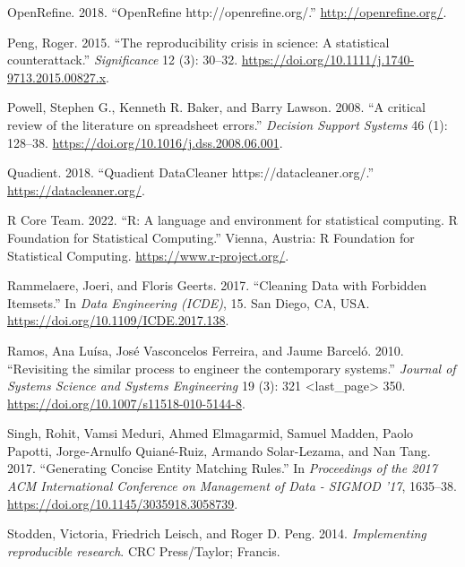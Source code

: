 \documentclass[
]{article}
\newlength{\cslhangindent}
\newlength{\cslentryspacingunit} %
\newenvironment{CSLReferences}[2] %
 {%
  \setlength{\parindent}{0pt}
  \ifodd #1
  \let\oldpar\par
  \def\par{\hangindent=\cslhangindent\oldpar}
  \fi
  \setlength{\parskip}{#2\cslentryspacingunit}
 }%
 {}
\begin{document}
\begin{CSLReferences}{1}{0}
\leavevmode{}%
OpenRefine. 2018. {``{OpenRefine http://openrefine.org/}.''}
\url{http://openrefine.org/}.

\leavevmode{}%
Peng, Roger. 2015. {``{The reproducibility crisis in science: A
statistical counterattack}.''} \emph{Significance} 12 (3): 30--32.
\url{https://doi.org/10.1111/j.1740-9713.2015.00827.x}.

\leavevmode{}%
Powell, Stephen G., Kenneth R. Baker, and Barry Lawson. 2008. {``{A
critical review of the literature on spreadsheet errors}.''}
\emph{Decision Support Systems} 46 (1): 128--38.
\url{https://doi.org/10.1016/j.dss.2008.06.001}.

\leavevmode{}%
Quadient. 2018. {``{Quadient DataCleaner https://datacleaner.org/}.''}
\url{https://datacleaner.org/}.

\leavevmode{}%
R Core Team. 2022. {``{R: A language and environment for statistical
computing. R Foundation for Statistical Computing}.''} Vienna, Austria:
R Foundation for Statistical Computing.
\url{https://www.r-project.org/}.

\leavevmode{}%
Rammelaere, Joeri, and Floris Geerts. 2017. {``{Cleaning Data with
Forbidden Itemsets}.''} In \emph{Data Engineering (ICDE)}, 15. San
Diego, CA, USA. \url{https://doi.org/10.1109/ICDE.2017.138}.

\leavevmode{}%
Ramos, Ana Luísa, José Vasconcelos Ferreira, and Jaume Barceló. 2010.
{``{Revisiting the similar process to engineer the contemporary
systems}.''} \emph{Journal of Systems Science and Systems Engineering}
19 (3): 321 \textless last\_page\textgreater{} 350.
\url{https://doi.org/10.1007/s11518-010-5144-8}.

\leavevmode{}%
Singh, Rohit, Vamsi Meduri, Ahmed Elmagarmid, Samuel Madden, Paolo
Papotti, Jorge-Arnulfo Quiané-Ruiz, Armando Solar-Lezama, and Nan Tang.
2017. {``{Generating Concise Entity Matching Rules}.''} In
\emph{Proceedings of the 2017 ACM International Conference on Management
of Data - SIGMOD '17}, 1635--38.
\url{https://doi.org/10.1145/3035918.3058739}.

\leavevmode{}%
Stodden, Victoria, Friedrich Leisch, and Roger D. Peng. 2014.
\emph{{Implementing reproducible research}}. CRC Press/Taylor; Francis.


\end{CSLReferences}
\end{document}
